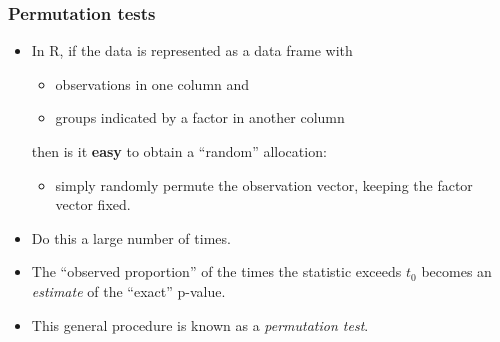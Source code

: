 \documentclass[a4paper]{article}
\begin{document}
\subsubsection{Permutation tests}
\begin{itemize}
	\item In R, if the data is represented as a data frame with
	\begin{itemize}
		\item observations in one column and
		\item groups indicated by a factor in another column
	\end{itemize}
	then is it \textbf{easy} to obtain a ``random'' allocation:
	\begin{itemize}
		\item simply randomly permute the observation vector, keeping the factor vector fixed.
	\end{itemize}
	\item Do this a large number of times.
	\item The ``observed proportion'' of the times the statistic exceeds \( t_0 \) becomes an \textit{estimate} of the ``exact'' p-value.
	\item This general procedure is known as a \textit{permutation test}.
\end{itemize}
\end{document}
